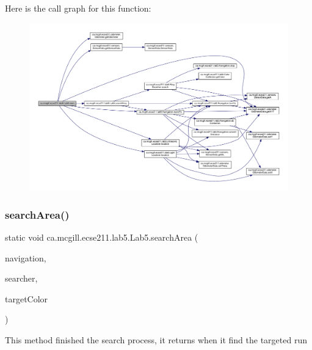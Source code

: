 Here is the call graph for this function\+:
\nopagebreak
\begin{figure}[H]
\begin{center}
\leavevmode
\includegraphics[width=350pt]{classca_1_1mcgill_1_1ecse211_1_1lab5_1_1_lab5_a82cca51f550ed0eb016bb2082d3fe755_cgraph}
\end{center}
\end{figure}
\mbox{\label{classca_1_1mcgill_1_1ecse211_1_1lab5_1_1_lab5_a0e80ac0068ef1ab41cfb571b8c65845c}} 
\subsubsection{\texorpdfstring{search\+Area()}{searchArea()}}
{\footnotesize\ttfamily static void ca.\+mcgill.\+ecse211.\+lab5.\+Lab5.\+search\+Area (\begin{DoxyParamCaption}\item[{\hyperlink{classca_1_1mcgill_1_1ecse211_1_1lab5_1_1_navigation}{Navigation}}]{navigation,  }\item[{\hyperlink{classca_1_1mcgill_1_1ecse211_1_1lab5_1_1_ring_searcher}{Ring\+Searcher}}]{searcher,  }\item[{Color\+Calibrator.\+Color}]{target\+Color }\end{DoxyParamCaption})\hspace{0.3cm}{\ttfamily [static]}}

This method finished the search process, it returns when it find the targeted run


